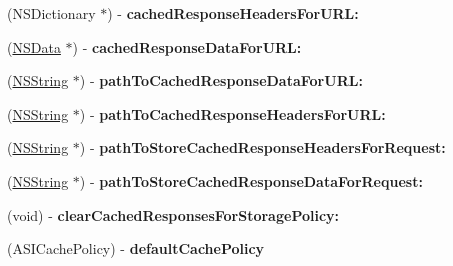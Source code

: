 \begin{DoxyCompactItemize}
\item 
\hypertarget{protocol_a_s_i_cache_delegate-p_ab7b267fc153dcf624c91e2d07513f868}{
(\-N\-S\-Dictionary $\ast$) -\/ {\bfseries cached\-Response\-Headers\-For\-U\-R\-L\-:}}
\label{protocol_a_s_i_cache_delegate-p_ab7b267fc153dcf624c91e2d07513f868}

\item 
\hypertarget{protocol_a_s_i_cache_delegate-p_a24c0d2a6834e5a0332f3d95198fc681c}{
(\hyperlink{class_n_s_data}{\-N\-S\-Data} $\ast$) -\/ {\bfseries cached\-Response\-Data\-For\-U\-R\-L\-:}}
\label{protocol_a_s_i_cache_delegate-p_a24c0d2a6834e5a0332f3d95198fc681c}

\item 
\hypertarget{protocol_a_s_i_cache_delegate-p_a692463be3a5c9abe5a239eb761431799}{
(\hyperlink{class_n_s_string}{\-N\-S\-String} $\ast$) -\/ {\bfseries path\-To\-Cached\-Response\-Data\-For\-U\-R\-L\-:}}
\label{protocol_a_s_i_cache_delegate-p_a692463be3a5c9abe5a239eb761431799}

\item 
\hypertarget{protocol_a_s_i_cache_delegate-p_a0cab288cf23b1d6adb76981ed591d324}{
(\hyperlink{class_n_s_string}{\-N\-S\-String} $\ast$) -\/ {\bfseries path\-To\-Cached\-Response\-Headers\-For\-U\-R\-L\-:}}
\label{protocol_a_s_i_cache_delegate-p_a0cab288cf23b1d6adb76981ed591d324}

\item 
\hypertarget{protocol_a_s_i_cache_delegate-p_ab9a190279d92a9fc5d7efeff1efad0ad}{
(\hyperlink{class_n_s_string}{\-N\-S\-String} $\ast$) -\/ {\bfseries path\-To\-Store\-Cached\-Response\-Headers\-For\-Request\-:}}
\label{protocol_a_s_i_cache_delegate-p_ab9a190279d92a9fc5d7efeff1efad0ad}

\item 
\hypertarget{protocol_a_s_i_cache_delegate-p_ab7f2a212c2d6391b1d9fb7a8da9f2c39}{
(\hyperlink{class_n_s_string}{\-N\-S\-String} $\ast$) -\/ {\bfseries path\-To\-Store\-Cached\-Response\-Data\-For\-Request\-:}}
\label{protocol_a_s_i_cache_delegate-p_ab7f2a212c2d6391b1d9fb7a8da9f2c39}

\item 
\hypertarget{protocol_a_s_i_cache_delegate-p_abb2c511be4be2274bd3e812ea978e2a6}{
(void) -\/ {\bfseries clear\-Cached\-Responses\-For\-Storage\-Policy\-:}}
\label{protocol_a_s_i_cache_delegate-p_abb2c511be4be2274bd3e812ea978e2a6}

\item 
\hypertarget{protocol_a_s_i_cache_delegate-p_a1207aea079945294e7bb48c621d82a67}{
(\-A\-S\-I\-Cache\-Policy) -\/ {\bfseries default\-Cache\-Policy}}
\label{protocol_a_s_i_cache_delegate-p_a1207aea079945294e7bb48c621d82a67}


\end{DoxyCompactItemize}
